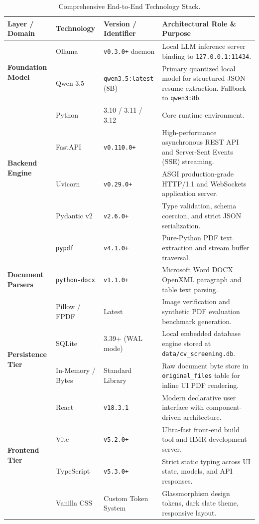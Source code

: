 \documentclass[11pt,a4paper]{report}
\begin{document}
\begin{table}[htbp]
\centering
\small
\begin{tabularx}{\textwidth}{l l p{3.2cm} X}
\toprule
\textbf{Layer / Domain} & \textbf{Technology} & \textbf{Version / Identifier} & \textbf{Architectural Role \& Purpose} \\
\midrule
\multirow{2}{*}{\textbf{Foundation Model}} & Ollama & \texttt{v0.3.0+} daemon & Local LLM inference server binding to \texttt{127.0.0.1:11434}. \\
& Qwen 3.5 & \texttt{qwen3.5:latest} (8B) & Primary quantized local model for structured JSON resume extraction. Fallback to \texttt{qwen3:8b}. \\
\midrule
\multirow{4}{*}{\textbf{Backend Engine}} & Python & 3.10 / 3.11 / 3.12 & Core runtime environment. \\
& FastAPI & \texttt{v0.110.0+} & High-performance asynchronous REST API and Server-Sent Events (SSE) streaming. \\
& Uvicorn & \texttt{v0.29.0+} & ASGI production-grade HTTP/1.1 and WebSockets application server. \\
& Pydantic v2 & \texttt{v2.6.0+} & Type validation, schema coercion, and strict JSON serialization. \\
\midrule
\multirow{3}{*}{\textbf{Document Parsers}} & \texttt{pypdf} & \texttt{v4.1.0+} & Pure-Python PDF text extraction and stream buffer traversal. \\
& \texttt{python-docx} & \texttt{v1.1.0+} & Microsoft Word DOCX OpenXML paragraph and table text parsing. \\
& Pillow / FPDF & Latest & Image verification and synthetic PDF evaluation benchmark generation. \\
\midrule
\multirow{2}{*}{\textbf{Persistence Tier}} & SQLite & 3.39+ (WAL mode) & Local embedded database engine stored at \texttt{data/cv\_screening.db}. \\
& In-Memory / Bytes & Standard Library & Raw document byte store in \texttt{original\_files} table for inline UI PDF rendering. \\
\midrule
\multirow{4}{*}{\textbf{Frontend Tier}} & React & \texttt{v18.3.1} & Modern declarative user interface with component-driven architecture. \\
& Vite & \texttt{v5.2.0+} & Ultra-fast front-end build tool and HMR development server. \\
& TypeScript & \texttt{v5.3.0+} & Strict static typing across UI state, models, and API responses. \\
& Vanilla CSS & Custom Token System & Glassmorphism design tokens, dark slate theme, responsive layout. \\
\bottomrule
\end{tabularx}
\caption{Comprehensive End-to-End Technology Stack.}
\label{tab:tech_stack}
\end{table}
\end{document}

